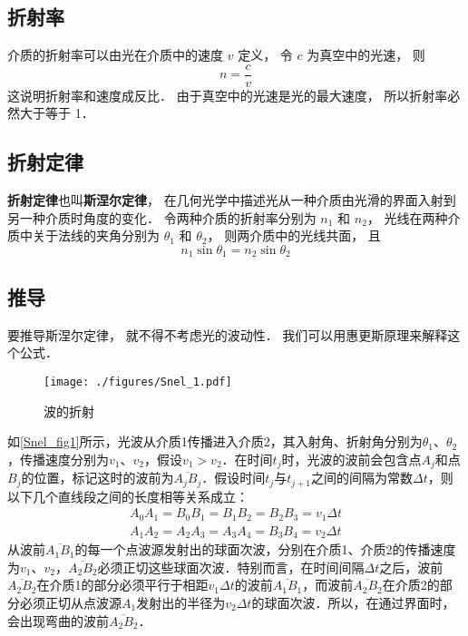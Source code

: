 
\subsection{折射率}
介质的折射率可以由光在介质中的速度 $v$ 定义， 令 $c$ 为真空中的光速， 则
\begin{equation}
n = \frac{c}{v}
\end{equation}
这说明折射率和速度成反比． 由于真空中的光速是光的最大速度， 所以折射率必然大于等于 1．

\subsection{折射定律}

\textbf{折射定律}也叫\textbf{斯涅尔定律}， 在几何光学中描述光从一种介质由光滑的界面入射到另一种介质时角度的变化． 令两种介质的折射率分别为 $n_1$ 和 $n_2$， 光线在两种介质中关于法线的夹角分别为 $\theta_1$ 和 $\theta_2$， 则两介质中的光线共面， 且
\begin{equation}
n_1 \sin\theta_1 = n_2 \sin\theta_2
\end{equation}


\subsection{推导}
要推导斯涅尔定律， 就不得不考虑光的波动性． 我们可以用惠更斯原理来解释这个公式．
\begin{figure}[ht]
\centering
\texttt{[image: ./figures/Snel\_1.pdf]}
\caption{波的折射} \label{Snel_fig1}
\end{figure}
如\autoref{Snel_fig1}所示，光波从介质1传播进入介质2，其入射角、折射角分别为$\theta_1$、$\theta_2$，传播速度分别为$v_1$、$v_2$，假设$v_1>v_2$．在时间$t_{j}$时，光波的波前会包含点$A_{j}$和点$B_{j}$的位置，标记这时的波前为$\overline {A_{j}B_{j}}$．假设时间$t_{j}$与$t_{{j+1}}$之间的间隔为常数$\Delta t$，则以下几个直线段之间的长度相等关系成立：
\begin{equation}
\begin{aligned}
A_{0}A_{1}=B_{0}B_{1}=B_{1}B_{2}=B_{2}B_{3}=v_{1}\Delta t \\
A_{1}A_{2}=A_{2}A_{3}=A_{3}A_{4}=B_{3}B_{4}=v_{2}\Delta t
\end{aligned}
\end{equation}
从波前$\overline {A_{1}B_{1}}$的每一个点波源发射出的球面次波，分别在介质1、介质2的传播速度为$v_1$、$v_2$，$\overline {A_{2}B_{2}}$必须正切这些球面次波．特别而言，在时间间隔$\Delta t$之后，波前$\overline {A_{2}B_{2}}$在介质1的部分必须平行于相距$v_{1}\Delta t$的波前$\overline {A_{1}B_{1}}$，而波前$\overline {A_{2}B_{2}}$在介质2的部分必须正切从点波源$A_{1}$发射出的半径为$v_{2}\Delta t$的球面次波．所以，在通过界面时，会出现弯曲的波前$\overline {A_{2}B_{2}}$．

